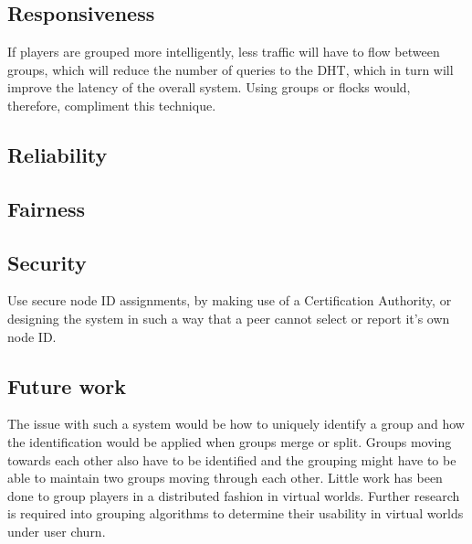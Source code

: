 \documentclass[10pt,a4paper,conference]{IEEEtran}
\begin{document}
\subsection{Responsiveness}

If players are grouped more intelligently, less traffic will have to flow between groups, which will reduce the number of queries to the DHT, which
in turn will improve the latency of the overall system. Using groups or flocks would, therefore, compliment this technique.

\label{distance_based}


\subsection{Reliability}


\subsection{Fairness}


\subsection{Security}


Use secure node ID assignments, by making use of a Certification Authority, or designing the system in such a way that a peer cannot select or report
it's own node ID.

\subsection{Future work}

The issue with such a system would be how to uniquely identify a group and how the identification would be applied when groups merge or split. Groups
moving towards each other also have to be identified and the grouping might have to be able to maintain two groups moving through each other. Little
work has been done to group players in a distributed fashion in virtual worlds. Further research is required into grouping algorithms to determine
their usability in virtual worlds under user churn.
\end{document}
